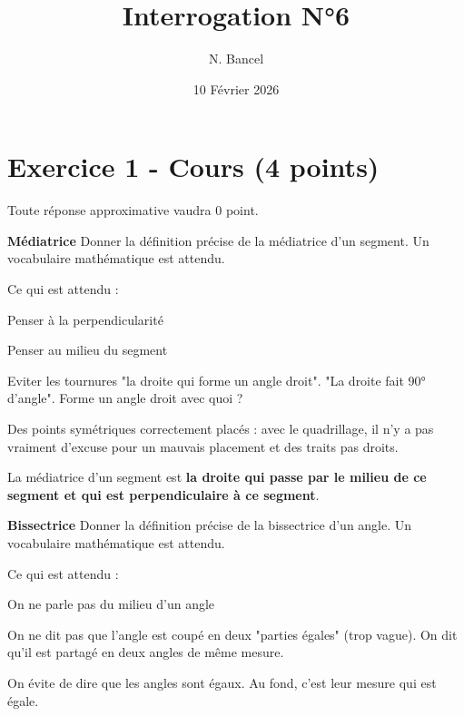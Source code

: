 \documentclass[answers]{exam}
\title{Interrogation N°6}
\author{N. Bancel}
\date{10 Février 2026}
\begin{document}
{\let\newpage\relax\maketitle}

\section*{Exercice 1 - Cours (4 points)}

\begin{Indication}
  Toute réponse approximative vaudra 0 point.
\end{Indication}

\begin{questions}
  \question[1.5] \textbf{Médiatrice} Donner la définition précise de la médiatrice d’un segment. Un vocabulaire mathématique est attendu.
  \begin{solution}
          \begin{Indication}

Ce qui est attendu : 
\begin{compactitem}
\item Penser à la perpendicularité
\item Penser au milieu du segment
\item Eviter les tournures "la droite qui forme un angle droit". "La droite fait 90° d'angle". Forme un angle droit avec quoi ?
\item Des points symétriques correctement placés : avec le quadrillage, il n'y a pas vraiment d'excuse pour un mauvais placement et des traits pas droits.
\end{compactitem}

      \end{Indication}
      La médiatrice d’un segment est \textbf{la droite qui passe par le milieu de ce segment et qui est perpendiculaire à ce segment}.
      \end{solution}
  \question[1.5] \textbf{Bissectrice} Donner la définition précise de la bissectrice d’un angle. Un vocabulaire mathématique est attendu.
      \begin{solution}
                  \begin{Indication}

Ce qui est attendu : 
\begin{compactitem}
\item On ne parle pas du milieu d'un angle  
\item On ne dit pas que l'angle est coupé en deux "parties égales" (trop vague). On dit qu'il est partagé en deux angles de même mesure.
\item On évite de dire que les angles sont égaux. Au fond, c'est leur mesure qui est égale.
\end{compactitem}


\end{Indication}
\end{solution}
\end{questions}
\end{document}
